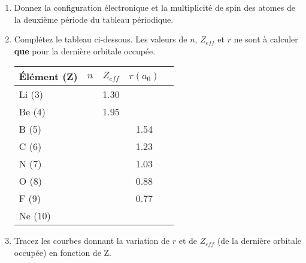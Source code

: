 \begin{enumerate}[\bf 1)]
\item Donnez la configuration \'electronique et la multiplicité de spin des atomes de la deuxi\`eme p\'eriode du tableau p\'eriodique.
\item Compl\'etez le tableau ci-dessous. Les valeurs de $n$, $Z_{eff}$ et $r$ ne sont \`a calculer \textbf{que} pour 
la derni\`ere orbitale occup\'ee.


\vrule

\begin{tabular}{|l|c|c|c|c|}
\hline
\textbf{\'El\'ement (Z)} & $n$ & $Z_{eff}$ & $r(a_0)$    \\ \hline
Li  (3)                  &     & 1.30      &             \\ \hline
Be  (4)                  &     & 1.95      &             \\ \hline
B   (5)                  &     &           & 1.54        \\ \hline
C   (6)                  &     &           & 1.23        \\ \hline
N   (7)                  &     &           & 1.03        \\ \hline
O   (8)                  &     &           & 0.88        \\ \hline
F   (9)                  &     &           & 0.77        \\ \hline
Ne (10)                  &     &           &             \\ \hline
\end{tabular}

\vrule

\item Tracez les courbes donnant la variation de $r$ et de $Z_{eff}$ 
(de la derni\`ere orbitale occup\'ee) en fonction de Z. 
\end{enumerate}
